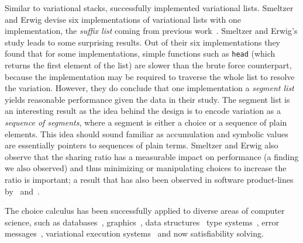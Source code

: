 Similar to variational stacks, \citet{SE17fosd} successfully implemented
variational lists. Smeltzer and Erwig devise six implementations of variational
lists with one implementation, the \emph{suffix list} coming from previous
work~\cite{EW11gttse}. Smeltzer and Erwig's study leads to some surprising
results. Out of their six implementations they found that for some
implementations, simple functions such as \texttt{head} (which returns the first
element of the list) are slower than the brute force counterpart, because the
implementation may be required to traverse the whole list to resolve the
variation. However, they do conclude that one implementation a \emph{segment
  list} yields reasonable performance given the data in their study. The segment
list is an interesting result as the idea behind the design is to encode
variation as a \emph{sequence of segments}, where a segment is either a choice
or a sequence of plain elements. This idea should sound familiar as accumulation
and symbolic values are essentially pointers to sequences of plain terms.
Smeltzer and Erwig also observe that the sharing ratio has a measurable impact
on performance (a finding we also observed) and thus minimizing or manipulating
choices to increase the ratio is important; a result that has also been observed
in software product-lines by~\citet{ARW+:ICSE13} and~\citet{KRE+:FOSD12}.

The
choice calculus has been successfully applied to diverse areas of computer
science, such as databases~\citep{ATW17dbpl,ATW18poly},
graphics~\citep{ES18diagrams}, data
structures~\citep{Walk14onward,EWC13fosd} type
systems~\citep{CCEW18popl,CCW18icfp,CEW:TOPLAS14,CEW12icfp}, error
messages~\citep{CES17jvlc,CE14popl,CEW12icfp,CES14hcc}, variational execution
systems~\citep{10.1145/3276487,M14} and now satisfiability solving.


